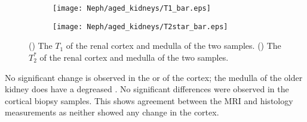 \begin{figure}[H]
	\centering
	\begin{subfigure}[c]{0.47\textwidth}
		\centering
		\texttt{[image: Neph/aged\_kidneys/T1\_bar.eps]}
		\caption{}
		\label{fig:ex_aged_t1_bar}
	\end{subfigure}
	\hfill
	\begin{subfigure}[c]{0.47\textwidth}
		\centering
		\texttt{[image: Neph/aged\_kidneys/T2star\_bar.eps]}
		\caption{}
		\label{fig:ex_aged_t2star_bar}
	\end{subfigure}
	\caption{() The $T_1$ of the renal cortex and medulla of the two samples. () The $T_2^*$ of the renal cortex and medulla of the two samples.}
	\label{fig:ex_aged_bar}
\end{figure}

No significant change is observed in the \tone or \ttwostar of the cortex; the medulla of the older kidney does have a degreased \tone. No significant differences were observed in the cortical biopsy samples. This shows agreement between the \ac{MRI} and histology measurements as neither showed any change in the cortex. 


